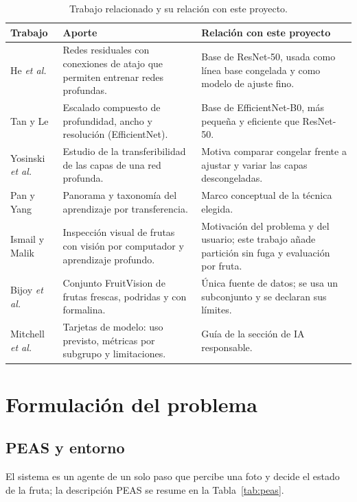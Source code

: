 \documentclass[10pt,twocolumn,letterpaper]{article}
\begin{document}
\begin{table}[t]\centering\footnotesize{}\caption{Trabajo relacionado y su relación con este proyecto.}\label{tab:rel}
\begin{tabular}{@{}p{3.1cm}p{6.6cm}p{7.5cm}@{}}\toprule Trabajo & Aporte & Relación con este proyecto \\ \midrule
He \textit{et al.} \cite{he} & Redes residuales con conexiones de atajo que permiten entrenar redes profundas. & Base de ResNet-50, usada como línea base congelada y como modelo de ajuste fino. \\
Tan y Le \cite{tan} & Escalado compuesto de profundidad, ancho y resolución (EfficientNet). & Base de EfficientNet-B0, más pequeña y eficiente que ResNet-50. \\
Yosinski \textit{et al.} \cite{yos} & Estudio de la transferibilidad de las capas de una red profunda. & Motiva comparar congelar frente a ajustar y variar las capas descongeladas. \\
Pan y Yang \cite{pan} & Panorama y taxonomía del aprendizaje por transferencia. & Marco conceptual de la técnica elegida. \\
Ismail y Malik \cite{ism} & Inspección visual de frutas con visión por computador y aprendizaje profundo. & Motivación del problema y del usuario; este trabajo añade partición sin fuga y evaluación por fruta. \\
Bijoy \textit{et al.} \cite{fv} & Conjunto FruitVision de frutas frescas, podridas y con formalina. & Única fuente de datos; se usa un subconjunto y se declaran sus límites. \\
Mitchell \textit{et al.} \cite{mit} & Tarjetas de modelo: uso previsto, métricas por subgrupo y limitaciones. & Guía de la sección de IA responsable. \\
\bottomrule\end{tabular}\end{table}

\section{Formulación del problema}
\subsection{PEAS y entorno}
El sistema es un agente de un solo paso que percibe una foto y decide el estado de la fruta; la descripción PEAS se resume en la Tabla~\ref{tab:peas}.
\end{document}
